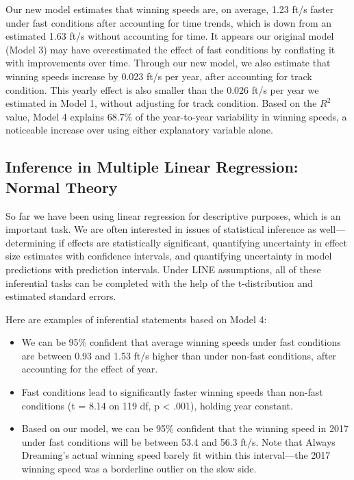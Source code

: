 \documentclass[
]{krantz}
\providecommand{\tightlist}{%
  \setlength{\itemsep}{0pt}\setlength{\parskip}{0pt}}
\begin{document}
Our new model estimates that winning speeds are, on average, 1.23 ft/s faster under fast conditions after accounting for time trends, which is down from an estimated 1.63 ft/s without accounting for time. It appears our original model (Model 3) may have overestimated the effect of fast conditions by conflating it with improvements over time. Through our new model, we also estimate that winning speeds increase by 0.023 ft/s per year, after accounting for track condition. This yearly effect is also smaller than the 0.026 ft/s per year we estimated in Model 1, without adjusting for track condition. Based on the \(R^2\) value, Model 4 explains 68.7\% of the year-to-year variability in winning speeds, a noticeable increase over using either explanatory variable alone.

\subsection{Inference in Multiple Linear Regression: Normal Theory}\label{multreg-inference}

So far we have been using linear regression for descriptive purposes, which is an important task. We are often interested in issues of statistical inference  as well---determining if effects are statistically significant, quantifying uncertainty in effect size estimates with confidence intervals, and quantifying uncertainty in model predictions with prediction intervals. Under LINE assumptions, all of these inferential tasks can be completed with the help of the t-distribution and estimated standard errors.

Here are examples of inferential statements based on Model 4:

\begin{itemize}
\tightlist
\item
  We can be 95\% confident that average winning speeds under fast conditions are between 0.93 and 1.53 ft/s higher than under non-fast conditions, after accounting for the effect of year.
\item
  Fast conditions lead to significantly faster winning speeds than non-fast conditions (t = 8.14 on 119 df, p \textless{} .001), holding year constant.
\item
  Based on our model, we can be 95\% confident that the winning speed in 2017 under fast conditions will be between 53.4 and 56.3 ft/s. Note that Always Dreaming's actual winning speed barely fit within this interval---the 2017 winning speed was a borderline outlier on the slow side.
\end{itemize}
\end{document}
